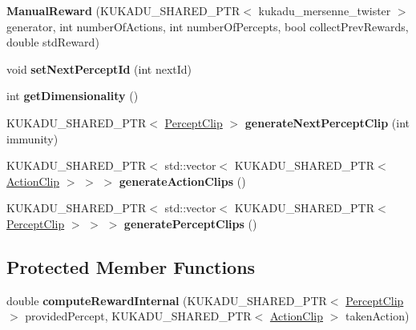 \begin{DoxyCompactItemize}
\item 
{\bfseries Manual\+Reward} (K\+U\+K\+A\+D\+U\+\_\+\+S\+H\+A\+R\+E\+D\+\_\+\+P\+TR$<$ kukadu\+\_\+mersenne\+\_\+twister $>$ generator, int number\+Of\+Actions, int number\+Of\+Percepts, bool collect\+Prev\+Rewards, double std\+Reward)\hypertarget{classkukadu_1_1ManualReward_a318822b732a0011ff4ff7cc8ff3d1a05}{}\label{classkukadu_1_1ManualReward_a318822b732a0011ff4ff7cc8ff3d1a05}

\item 
void {\bfseries set\+Next\+Percept\+Id} (int next\+Id)\hypertarget{classkukadu_1_1ManualReward_a5822e7d8bef85ce182c0c8c82651cc33}{}\label{classkukadu_1_1ManualReward_a5822e7d8bef85ce182c0c8c82651cc33}

\item 
int {\bfseries get\+Dimensionality} ()\hypertarget{classkukadu_1_1ManualReward_a0c22cd7ef3f972b6294ace8847283403}{}\label{classkukadu_1_1ManualReward_a0c22cd7ef3f972b6294ace8847283403}

\item 
K\+U\+K\+A\+D\+U\+\_\+\+S\+H\+A\+R\+E\+D\+\_\+\+P\+TR$<$ \hyperlink{classkukadu_1_1PerceptClip}{Percept\+Clip} $>$ {\bfseries generate\+Next\+Percept\+Clip} (int immunity)\hypertarget{classkukadu_1_1ManualReward_a0fc7e055ddabdf964dc073b795a6b701}{}\label{classkukadu_1_1ManualReward_a0fc7e055ddabdf964dc073b795a6b701}

\item 
K\+U\+K\+A\+D\+U\+\_\+\+S\+H\+A\+R\+E\+D\+\_\+\+P\+TR$<$ std\+::vector$<$ K\+U\+K\+A\+D\+U\+\_\+\+S\+H\+A\+R\+E\+D\+\_\+\+P\+TR$<$ \hyperlink{classkukadu_1_1ActionClip}{Action\+Clip} $>$ $>$ $>$ {\bfseries generate\+Action\+Clips} ()\hypertarget{classkukadu_1_1ManualReward_ab265fb63722a405fa1b5cfaa9d96b47f}{}\label{classkukadu_1_1ManualReward_ab265fb63722a405fa1b5cfaa9d96b47f}

\item 
K\+U\+K\+A\+D\+U\+\_\+\+S\+H\+A\+R\+E\+D\+\_\+\+P\+TR$<$ std\+::vector$<$ K\+U\+K\+A\+D\+U\+\_\+\+S\+H\+A\+R\+E\+D\+\_\+\+P\+TR$<$ \hyperlink{classkukadu_1_1PerceptClip}{Percept\+Clip} $>$ $>$ $>$ {\bfseries generate\+Percept\+Clips} ()\hypertarget{classkukadu_1_1ManualReward_a6bc98a96fc54aaad311d35c7b1043d65}{}\label{classkukadu_1_1ManualReward_a6bc98a96fc54aaad311d35c7b1043d65}

\end{DoxyCompactItemize}
\subsection*{Protected Member Functions}
\begin{DoxyCompactItemize}
\item 
double {\bfseries compute\+Reward\+Internal} (K\+U\+K\+A\+D\+U\+\_\+\+S\+H\+A\+R\+E\+D\+\_\+\+P\+TR$<$ \hyperlink{classkukadu_1_1PerceptClip}{Percept\+Clip} $>$ provided\+Percept, K\+U\+K\+A\+D\+U\+\_\+\+S\+H\+A\+R\+E\+D\+\_\+\+P\+TR$<$ \hyperlink{classkukadu_1_1ActionClip}{Action\+Clip} $>$ taken\+Action)\hypertarget{classkukadu_1_1ManualReward_accd1c514e0c2e4f64c80dc8dc0dd3a43}{}\label{classkukadu_1_1ManualReward_accd1c514e0c2e4f64c80dc8dc0dd3a43}

\end{DoxyCompactItemize}
